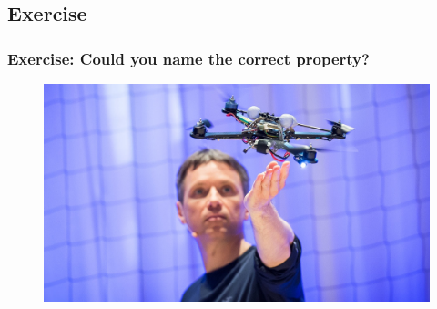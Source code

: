 \subsection[Exercise]{Exercise}
\begin{frame}
	\frametitle{Exercise: Could you name the correct property?}
	\begin{figure}
\centering
\includegraphics[width=1\linewidth]{control-goals/quadcopter}
\label{fig:ted-drone}
\end{figure}

\end{frame}



